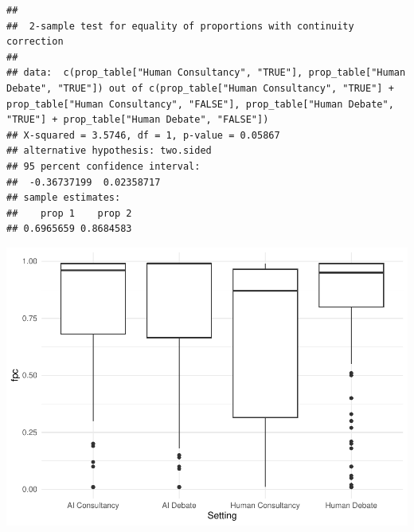 \documentclass[
]{article}
\newenvironment{Shaded}{\begin{snugshade}}{\end{snugshade}}
\newcommand{\AttributeTok}[1]{\textcolor[rgb]{0.13,0.29,0.53}{#1}}
\newcommand{\FunctionTok}[1]{\textcolor[rgb]{0.13,0.29,0.53}{\textbf{#1}}}
\newcommand{\NormalTok}[1]{#1}
\newcommand{\OtherTok}[1]{\textcolor[rgb]{0.56,0.35,0.01}{#1}}
\newcommand{\SpecialCharTok}[1]{\textcolor[rgb]{0.81,0.36,0.00}{\textbf{#1}}}
\newcommand{\StringTok}[1]{\textcolor[rgb]{0.31,0.60,0.02}{#1}}
\begin{document}
\begin{verbatim}
## 
##  2-sample test for equality of proportions with continuity correction
## 
## data:  c(prop_table["Human Consultancy", "TRUE"], prop_table["Human Debate", "TRUE"]) out of c(prop_table["Human Consultancy", "TRUE"] + prop_table["Human Consultancy", "FALSE"], prop_table["Human Debate", "TRUE"] + prop_table["Human Debate", "FALSE"])
## X-squared = 3.5746, df = 1, p-value = 0.05867
## alternative hypothesis: two.sided
## 95 percent confidence interval:
##  -0.36737199  0.02358717
## sample estimates:
##    prop 1    prop 2 
## 0.6965659 0.8684583
\end{verbatim}

\begin{Shaded}
\end{Shaded}

\includegraphics{debate-2309_files/figure-latex/final probability correct-1.pdf}
\end{document}
